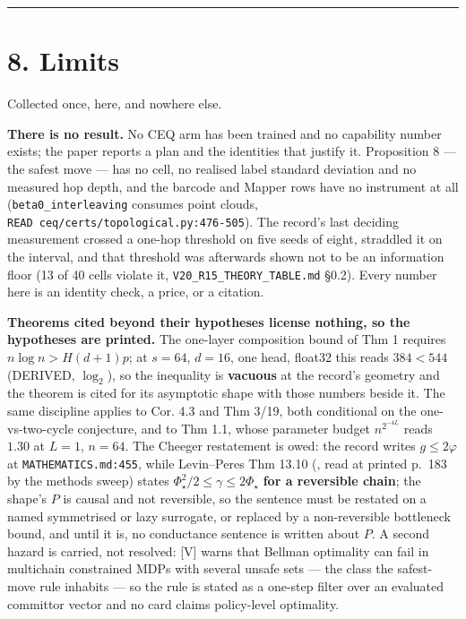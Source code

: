 \documentclass[11pt,a4paper]{article}
\theoremstyle{plain}
\theoremstyle{definition}
\theoremstyle{remark}
\begin{document}
\begin{center}\rule{0.5\linewidth}{0.5pt}\end{center}

\section{8. Limits}\label{limits}

Collected once, here, and nowhere else.

\textbf{There is no result.} No CEQ arm has been trained and no
capability number exists; the paper reports a plan and the identities
that justify it. Proposition 8 --- the safest move --- has no cell, no
realised label standard deviation and no measured hop depth, and the
barcode and Mapper rows have no instrument at all
(\texttt{beta0\_interleaving} consumes point clouds,
\texttt{READ\ ceq/certs/topological.py:476-505}). The record's last
deciding measurement crossed a one-hop threshold on five seeds of eight,
straddled it on the interval, and that threshold was afterwards shown
not to be an information floor (13 of 40 cells violate it,
\texttt{V20\_R15\_THEORY\_TABLE.md} §0.2). Every number here is an
identity check, a price, or a citation.

\textbf{Theorems cited beyond their hypotheses license nothing, so the
hypotheses are printed.} The one-layer composition bound of
\citep{peng-2024-transformer-limitations} Thm 1 requires
\(n\log n > H(d+1)p\); at \(s=64\), \(d=16\), one head, float32 this
reads \(384 < 544\) (DERIVED, \(\log_2\)), so the inequality is
\textbf{vacuous} at the record's geometry and the theorem is cited for
its asymptotic shape with those numbers beside it. The same discipline
applies to \citep{sanford-2024-logdepth} Cor. 4.3 and
\citep{sanford-2024-graph-algorithms} Thm 3/19, both conditional on the
one-vs-two-cycle conjecture, and to \citep{chen-2024-multilayer} Thm
1.1, whose parameter budget \(n^{2^{-4L}}\) reads \(1.30\) at \(L=1\),
\(n=64\). The Cheeger restatement is owed: the record writes
\(g\le 2\varphi\) at \texttt{MATHEMATICS.md:455}, while Levin--Peres Thm
13.10 (\citep{levin-2017-markov-mixing}, read at printed p.~183 by the
methods sweep) states \(\Phi_\star^2/2\le\gamma\le 2\Phi_\star\)
\textbf{for a reversible chain}; the shape's \(P\) is causal and not
reversible, so the sentence must be restated on a named symmetrised or
lazy surrogate, or replaced by a non-reversible bottleneck bound, and
until it is, no conductance sentence is written about \(P\). A second
hazard is carried, not resolved:
\citep{misra-2023-safety-constrained-mdp} {[}V{]} warns that Bellman
optimality can fail in multichain constrained MDPs with several unsafe
sets --- the class the safest-move rule inhabits --- so the rule is
stated as a one-step filter over an evaluated committor vector and no
card claims policy-level optimality.
\end{document}
